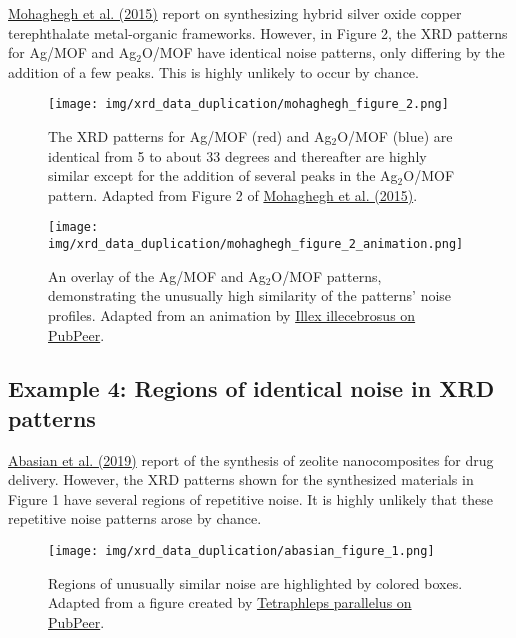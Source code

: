 \documentclass[letterpaper, 12pt]{article}
\begin{document}
\href{https://doi.org/10.1007/s10853-015-9003-3}{Mohaghegh et al. (2015)} report on synthesizing hybrid silver oxide copper terephthalate metal-organic frameworks. However, in Figure 2, the XRD patterns for Ag/MOF and Ag$_\text{2}$O/MOF have identical noise patterns, only differing by the addition of a few peaks. This is highly unlikely to occur by chance. 

\begin{figure}[h!tbp]
    \centering
    \texttt{[image: img/xrd\_data\_duplication/mohaghegh\_figure\_2.png]}
    \caption*{The XRD patterns for Ag/MOF (red) and Ag$_\text{2}$O/MOF (blue) are identical from 5 to about 33 degrees and thereafter are highly similar except for the addition of several peaks in the Ag$_\text{2}$O/MOF pattern. Adapted from Figure 2 of \href{https://doi.org/10.1007/s10853-015-9003-3}{Mohaghegh et al. (2015)}.}
\end{figure}

\begin{figure}[h!tbp]
    \centering
    \texttt{[image: img/xrd\_data\_duplication/mohaghegh\_figure\_2\_animation.png]}
    \caption*{An overlay of the Ag/MOF and Ag$_\text{2}$O/MOF patterns, demonstrating the unusually high similarity of the patterns' noise profiles. Adapted from an animation by \href{https://pubpeer.com/publications/7BE7C2A93C385F700F1C6B5BC90294\#8}{Illex illecebrosus on PubPeer}.}
\end{figure}

\pagebreak

\subsection*{Example 4: Regions of identical noise in XRD patterns}

\href{https://doi.org/10.1016/j.ijbiomac.2018.09.215}{Abasian et al. (2019)} report of the synthesis of zeolite nanocomposites for drug delivery. However, the XRD patterns shown for the synthesized materials in Figure 1 have several regions of repetitive noise. It is highly unlikely that these repetitive noise patterns arose by chance.

\begin{figure}[h!tbp]
    \centering
    \texttt{[image: img/xrd\_data\_duplication/abasian\_figure\_1.png]}
    \caption*{Regions of unusually similar noise are highlighted by colored boxes. Adapted from a figure created by \href{https://pubpeer.com/publications/DB4037BDC430AFA6C281842E945363\#1}{Tetraphleps parallelus on PubPeer}.}
\end{figure}
\end{document}
